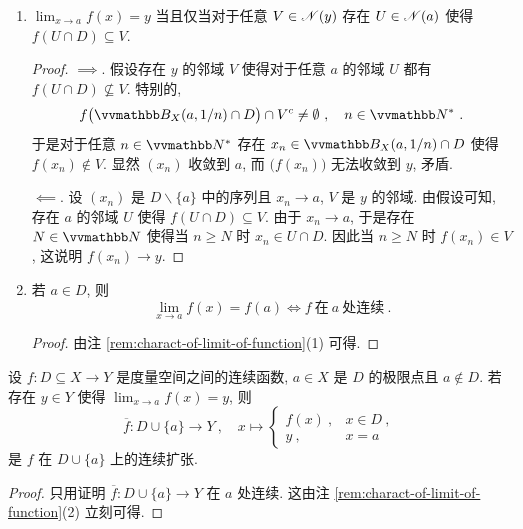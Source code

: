 \begin{remark}\label{rem:charact-of-limit-of-function}
    \begin{enumerate}
        \item \(\lim_{x \to a} f(x) = y\) 当且仅当对于任意 \(V \in \mathscr N(y)\) 存在 \(U \in \mathscr N(a)\) 使得 \(f(U \cap D) \subseteq V\).
        \begin{proof}
            \(\implies\). 假设存在 \(y\) 的邻域 \(V\) 使得对于任意 \(a\) 的邻域 \(U\) 都有 \(f(U \cap D) \nsubseteq V\). 特别的,
            \[
                f\bigl(\B_X(a, 1 / n) \cap D\bigr) \cap V^c \neq \emptyset\ ,\quad n \in \N^\ast\ .
            \]
            于是对于任意 \(n \in \N^\ast\) 存在 \(x_n \in \B_X(a, 1 / n) \cap D\) 使得 \(f(x_n) \notin V\). 显然 \((x_n)\) 收敛到 \(a\), 而 \(\bigl(f(x_n)\bigr)\) 无法收敛到 \(y\), 矛盾.

            \(\impliedby\). 设 \((x_n)\) 是 \(D \backslash \{a\}\) 中的序列且 \(x_n \to a\), \(V\) 是 \(y\) 的邻域. 由假设可知, 存在 \(a\) 的邻域 \(U\) 使得 \(f(U \cap D) \subseteq V\). 由于 \(x_n \to a\), 于是存在 \(N \in \N\) 使得当 \(n \geq N\) 时 \(x_n \in U \cap D\). 因此当 \(n \geq N\) 时 \(f(x_n) \in V\), 这说明 \(f(x_n) \to y\).
        \end{proof}
        \item 若 \(a \in D\), 则
        \[
            \lim_{x \to a} f(x) = f(a) \iff f\ \text{在}\ a\ \text{处连续}\ .
        \]
        \begin{proof}
            由注 \ref{rem:charact-of-limit-of-function}(1) 可得.
        \end{proof}
    \end{enumerate}
\end{remark}

\begin{proposition}
    设 \(f \colon D \subseteq X \to Y\) 是度量空间之间的连续函数, \(a \in X\) 是 \(D\) 的极限点且 \(a \notin D\). 若存在 \(y \in Y\) 使得 \(\lim_{x \to a} f(x) = y\), 则
    \[
        \overline f \colon D \cup \{a\} \to Y\ ,\quad x \mapsto
        \begin{cases}
            f(x)\ , & x \in D\ , \\
            y\ ,    & x = a
        \end{cases}
    \]
    是 \(f\) 在 \(D \cup \{a\}\) 上的连续扩张.
\end{proposition}

\begin{proof}
    只用证明 \(\overline f \colon D \cup \{a\} \to Y\) 在 \(a\) 处连续. 这由注 \ref{rem:charact-of-limit-of-function}(2) 立刻可得.
\end{proof}

